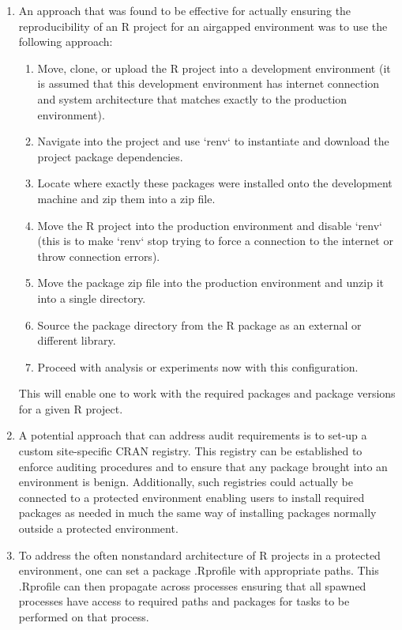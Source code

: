\documentclass{amia}
\begin{document}
\begin{enumerate}
	\item An approach that was found to be effective for actually ensuring the reproducibility of an R project for an airgapped environment was to use the following approach:
	\begin{enumerate}
		\item Move, clone, or upload the R project into a development environment (it is assumed that this development environment has internet connection and system architecture that matches exactly to the production environment).
		\item Navigate into the project and use `renv` to instantiate and download the project package dependencies.
		\item Locate where exactly these packages were installed onto the development machine and zip them into a zip file.
		\item Move the R project into the production environment and disable `renv` (this is to make `renv` stop trying to force a connection to the internet or throw connection errors).
		\item Move the package zip file into the production environment and unzip it into a single directory.
		\item Source the package directory from the R package as an external or different library. 
		\item Proceed with analysis or experiments now with this configuration.
	\end{enumerate}
	This will enable one to work with the required packages and package versions for a given R project. 
	\item A potential approach that can address audit requirements is to set-up a custom site-specific CRAN registry. This registry can be established to enforce auditing procedures and to ensure that any package brought into an environment is benign. Additionally, such registries could actually be connected to a protected environment enabling users to install required packages as needed in much the same way of installing packages normally outside a protected environment. 
	\item To address the often nonstandard architecture of R projects in a protected environment, one can set a package .Rprofile with appropriate paths. This .Rprofile can then propagate across processes ensuring that all spawned processes have access to required paths and packages for tasks to be performed on that process.
\end{enumerate}
\end{document}
